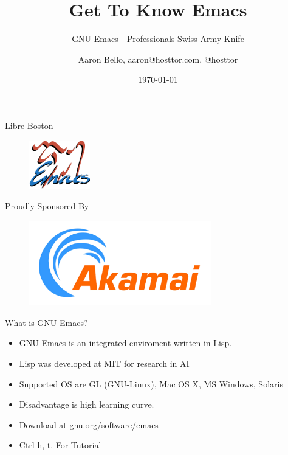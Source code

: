 \documentclass[english,14pt,presentation]{beamer}
\title{Get To Know Emacs}
\subtitle{GNU Emacs - Professionals Swiss Army Knife}
\author{Aaron Bello, aaron@hosttor.com, @hosttor}
\date{\today}
\begin{document}
\begin{frame}{Libre Boston}
\begin{figure}
\centering
\includegraphics[width=100]{images/emacs.png}
\end{figure}
\titlepage
\end{frame}

\begin{frame}{Proudly Sponsored By}
\begin{figure}
\centering
\includegraphics[width=300]{images/akamai.png}
\end{figure}
\end{frame}

\begin{frame}{What is GNU Emacs?}
\begin{itemize}
\pause \item GNU Emacs is an integrated enviroment written in Lisp. 
\pause \item Lisp was developed at MIT for research in AI
\pause \item Supported OS are GL (GNU-Linux), Mac OS X, MS Windows, Solaris
\pause \item Disadvantage is high learning curve.
\pause \item Download at gnu.org/software/emacs
\pause \item Ctrl-h, t. For Tutorial
\end{itemize}
\end{frame}
\end{document}
